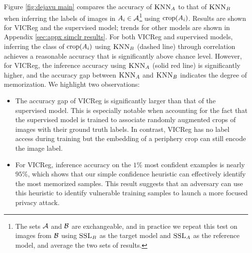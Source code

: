 Figure \ref{fig:dejavu main} compares the accuracy of $\textsc{KNN}_A$ to that of $\textsc{KNN}_B$ when inferring the labels of images in $A_i \in \mathcal{A}$\footnote{The sets $\mathcal{A}$ and $\mathcal{B}$ are exchangeable, and in practice we repeat this test on images from $\mathcal{B}$ using $\textsc{SSL}_B$ as the target model and $\textsc{SSL}_A$ as the reference model, and average the two sets of results.} using $\mathrm{crop}({A_i})$.
Results are shown for VICReg and the supervised model; trends for other models are shown in Appendix \ref{sec:appx simclr results}. For both VICReg and supervised models, inferring the class of $\mathrm{crop}({A_i})$ using $\textsc{KNN}_B$ (dashed line) through correlation achieves a reasonable accuracy that is significantly above chance level. However, for VICReg, the inference accuracy using $\textsc{KNN}_A$ (solid red line) is significantly higher, and the accuracy gap between $\textsc{KNN}_A$ and $\textsc{KNN}_B$ indicates the degree of \dejavu memorization. We highlight two observations: 
\begin{itemize}
    \item The accuracy gap of VICReg is significantly larger than that of the supervised model. This is especially notable when accounting for the fact that the supervised model is trained to associate randomly augmented crops of images with their ground truth labels. In contrast, VICReg has no label access during training but the embedding of a periphery crop can still encode the image label. 
    \item For VICReg, inference accuracy on the $1\%$ most confident examples is nearly $95\%$, which shows that our simple confidence heuristic can effectively identify the most memorized samples. This result suggests that an adversary can use this heuristic to identify vulnerable training samples to launch a more focused privacy attack.
\end{itemize}
\vspace{-.75em}
